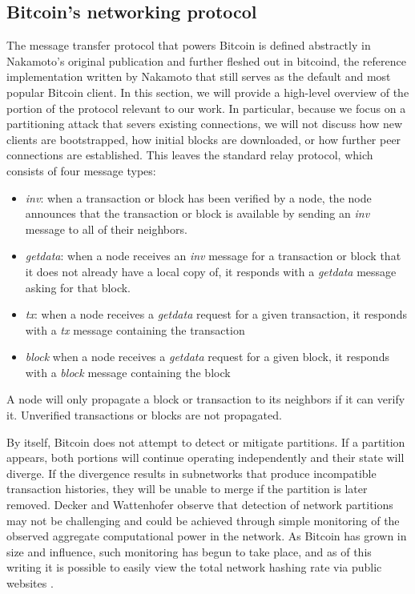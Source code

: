 \subsection{Bitcoin's networking protocol}
The message transfer protocol that powers Bitcoin is defined abstractly in Nakamoto's original publication \cite{Nakamoto} and further fleshed out in bitcoind, the reference implementation written by Nakamoto that still serves as the default and most popular Bitcoin client. In this section, we will provide a high-level overview of the portion of the protocol relevant to our work. In particular, because we focus on a partitioning attack that severs existing connections, we will not discuss how new clients are bootstrapped, how initial blocks are downloaded, or how further peer connections are established. This leaves the standard relay protocol, which consists of four message types:

\begin{itemize}

\item \textit{inv}: when a transaction or block has been verified by a node, the node announces that the transaction or block is available by sending an \textit{inv} message to all of their neighbors.
\item \textit{getdata}: when a node receives an \textit{inv} message for a transaction or block that it does not already have a local copy of, it responds with a \textit{getdata} message asking for that block.
\item \textit{tx}: when a node receives a \textit{getdata} request for a given transaction, it responds with a \textit{tx} message containing the transaction
\item \textit{block} when a node receives a \textit{getdata} request for a given block, it responds with a \textit{block} message containing the block

\end{itemize}

A node will only propagate a block or transaction to its neighbors if it can verify it. Unverified transactions or blocks are not propagated.

By itself, Bitcoin does not attempt to detect or mitigate partitions. If a partition appears, both portions will continue operating independently and their state will diverge. If the divergence results in subnetworks that produce incompatible transaction histories, they will be unable to merge if the partition is later removed. Decker and Wattenhofer \cite{DeckerWattenhofer2013} observe that detection of network partitions may not be challenging and could be achieved through simple monitoring of the observed aggregate computational power in the network. As Bitcoin has grown in size and influence, such monitoring has begun to take place, and as of this writing it is possible to easily view the total network hashing rate via public websites \cite{sipa}.

